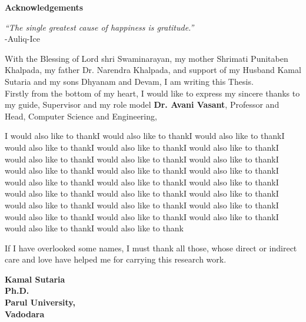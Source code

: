 \thispagestyle{empty}
\newpage
\cleardoublepage{}
{}
\begin{center}
{\Large \bf Acknowledgements}\\
\end{center}
\vspace{10pt}
\begin{flushright}
\textit{“The single greatest cause of happiness is gratitude.” }\\
\vspace{5mm}
-Auliq-Ice
\end{flushright}
\hspace{10mm}With the Blessing of Lord shri Swaminarayan, my mother Shrimati Punitaben Khalpada, my father Dr. Narendra Khalpada, and support of my Husband Kamal Sutaria and my sons Dhyanam and Devam, I am writing this Thesis. \\

Firstly from the bottom of my heart, I would like to express my sincere thanks to my guide, Supervisor and my role model \textbf{Dr.  Avani Vasant}, Professor and Head, Computer Science and Engineering, 

I would also like to thankI would also like to thankI would also like to thankI would also like to thankI would also like to thankI would also like to thankI would also like to thankI would also like to thankI would also like to thankI would also like to thankI would also like to thankI would also like to thankI would also like to thankI would also like to thankI would also like to thankI would also like to thankI would also like to thankI would also like to thankI would also like to thankI would also like to thankI would also like to thankI would also like to thankI would also like to thankI would also like to thankI would also like to thankI would also like to thank

If I have overlooked some names, I must thank all those, whose direct or indirect care and love have helped me for carrying this research work.\\


\vspace{1.5cm}
\begin{flushright}
\textbf{Kamal Sutaria \\ Ph.D.\\ Parul University, \\Vadodara}\\ 
\end{flushright}